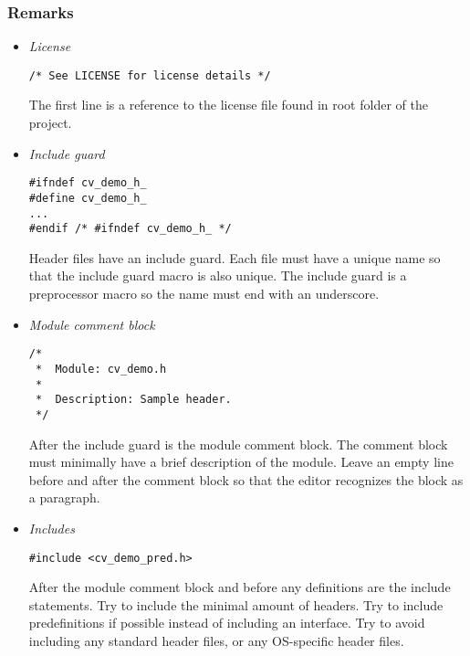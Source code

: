 \subsubsection{Remarks}

\begin{itemize}

\item \emph{License}

\begin{lstlisting}
/* See LICENSE for license details */
\end{lstlisting}

    The first line is a reference to the license file found in root folder
    of the project.

\item \emph{Include guard}

\begin{lstlisting}
#ifndef cv_demo_h_
#define cv_demo_h_
...
#endif /* #ifndef cv_demo_h_ */
\end{lstlisting}

    Header files have an include guard.  Each file must have a unique name
    so that the include guard macro is also unique.  The include guard is
    a preprocessor macro so the name must end with an underscore.

\item \emph{Module comment block}

\begin{lstlisting}
/*
 *  Module: cv_demo.h
 *
 *  Description: Sample header.
 */
\end{lstlisting}

    After the include guard is the module comment block.  The comment block
    must minimally have a brief description of the module.  Leave an empty line
    before and after the comment block so that the editor recognizes the block
    as a paragraph.

\item \emph{Includes}

\begin{lstlisting}
#include <cv_demo_pred.h>
\end{lstlisting}

    After the module comment block and before any definitions are the include
    statements.  Try to include the minimal amount of headers.  Try to include
    predefinitions if possible instead of including an interface.  Try to
    avoid including any standard header files, or any OS-specific header
    files.


\end{itemize}
